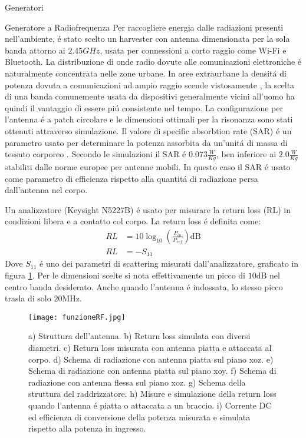 \begin{section}{Generatori}
    \begin{subsection}{Generatore a Radiofrequenza}
        Per raccogliere energia dalle radiazioni presenti nell'ambiente, \'e stato scelto un harvester con antenna dimensionata per la sola banda attorno ai \(2.45GHz\), usata per connessioni a corto raggio come Wi-Fi e Bluetooth. La distribuzione di onde radio dovute alle comunicazioni elettroniche \'e naturalmente concentrata nelle zone urbane. In aree extraurbane la densit\'a di potenza dovuta a comunicazioni ad ampio raggio scende vistosamente \cite{ibrahimRadioFrequencyEnergy2022}, la scelta di una banda comunemente usata da dispositivi generalmente vicini all'uomo ha quindi il vantaggio di essere pi\'u consistente nel tempo. La configurazione per l'antenna \'e a patch circolare e le dimensioni ottimali per la risonanza sono stati ottenuti attraverso simulazione. Il valore di specific absorbtion rate (SAR) \'e un parametro usato per determinare la potenza assorbita da un'unit\'a di massa di tessuto corporeo \cite{vallozzi26LatestDevelopments2016}. Secondo le simulazioni il SAR \'e \(0.073\frac{W}{Kg}\), ben inferiore ai \(2.0\frac{W}{Kg}\) stabiliti dalle norme europee per antenne mobili. In questo caso il SAR \'e usato come parametro di efficienza rispetto alla quantit\'a di radiazione persa dall'antenna nel corpo. 


        
        Un analizzatore (Keysight N5227B) \'e usato per misurare la return loss (RL) in condizioni libera e a contatto col corpo. 
        La return loss \'e definita come:
        \begin{equation*}
            \begin{aligned}
            RL&=10\log_{10}\left( \frac{P_{in}}{P_{ref}} \right) \mathrm{dB}\\
            RL&=-S_{11}
            \end{aligned}
        \end{equation*}
        Dove \(S_{11}\) \'e uno dei parametri di scattering misurati dall'analizzatore, graficato in figura \ref{fig:funzioneRF}. Per le dimensioni scelte si nota effettivamente un picco di \(10\mathrm{dB}\) nel centro banda desiderato. Anche quando l'antenna \'e indossata, lo stesso picco trasla di solo \(20\mathrm{MHz}\).
        

        \begin{figure}[hbt!]
            \texttt{[image: funzioneRF.jpg]}
            \centering
            \caption{a) Struttura dell'antenna. b) Return loss simulata con diversi diametri. c) Return loss misurata con antenna piatta e attaccata al corpo. d) Schema di radiazione con antenna piatta sul piano xoz. e) Schema di radiazione con antenna piatta sul piano xoy. f) Schema di radiazione con antenna flessa sul piano xoz. g) Schema della struttura del raddrizzatore. h) Misure e simulazione della return loss quando l'antenna \'e piatta o attaccata a un braccio. i) Corrente DC ed efficienza di conversione della potenza misurata e simulata rispetto alla potenza in ingresso.\cite{kouWearableAllFabricHybrid2024}}
            \label{fig:funzioneRF}
        \end{figure}
        

\end{subsection}
\end{section}
